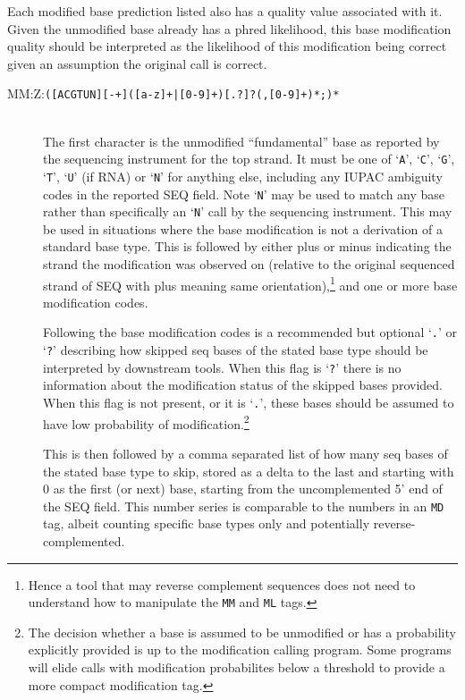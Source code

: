 \documentclass[10pt]{article}
\newcommand{\tagregex}[1]{{\tt #1}}
\begin{document}
Each modified base prediction listed also has a quality value associated with it.
Given the unmodified base already has a phred likelihood, this base modification quality should be interpreted as the likelihood of this modification being correct given an assumption the original call is correct.

\begin{description}
\item[MM:Z:\tagregex{([ACGTUN][-+]([a-z]+|[0-9]+)[.?]?(,[0-9]+)*;)*}]
\hfill\\
The first character is the unmodified ``fundamental'' base as reported
by the sequencing instrument for the top strand.
It must be one of `{\tt A}', `{\tt C}', `{\tt G}', `{\tt T}', `{\tt U}' (if RNA) or `{\tt N}' for anything else, including any IUPAC ambiguity codes in the reported SEQ field.
Note `{\tt N}' may be used to match any base rather than specifically an `{\tt N}' call by the sequencing instrument.
This may be used in situations where the base modification is not a derivation of a standard base type.
This is followed by either plus or minus indicating the strand the modification was observed on (relative to the original sequenced strand of {\sf SEQ} with plus meaning same orientation),\footnote{Hence a tool that may reverse complement sequences does not need to understand how to manipulate the {\tt MM} and {\tt ML} tags.} and one or more base modification codes.

Following the base modification codes is a recommended but optional `{\tt .}' or `{\tt ?}' describing how skipped seq bases of the stated base type should be interpreted by downstream tools.
When this flag is `{\tt ?}' there is no information about the modification status of the skipped bases provided.
When this flag is not present, or it is `{\tt .}', these bases should be assumed to have low probability of modification.\footnote{The decision whether a base is assumed to be unmodified or has a probability explicitly provided is up to the modification calling program. Some programs will elide calls with modification probabilites below a threshold to provide a more compact modification tag.}

This is then followed by a comma separated list of how many seq bases of the stated base type to skip, stored as a delta to the last and starting with 0 as the first (or next) base, starting from the uncomplemented 5' end of the {\sf SEQ} field.
This number series is comparable to the numbers in an {\tt MD} tag,
albeit counting specific base types only and potentially reverse-complemented.


\end{description}
\end{document}
